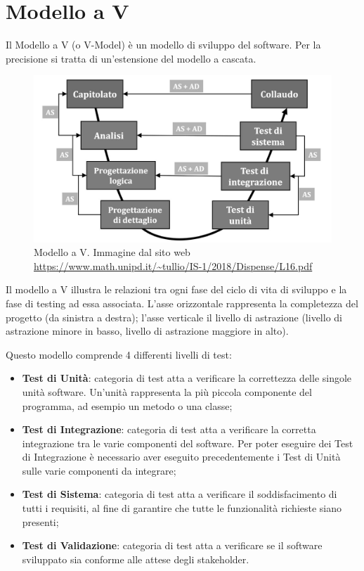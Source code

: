 \section{Modello a V}
\label{modelloV}

Il Modello a V (o V-Model) è un modello di sviluppo del software. Per la precisione si tratta di un'estensione del modello a cascata. 

\begin{figure}[H]
\centering
	\includegraphics[width=0.7\linewidth]{./images/modellov.jpg} 
	\caption{Modello a V. Immagine dal sito web \url{https://www.math.unipd.it/~tullio/IS-1/2018/Dispense/L16.pdf}}
	\label{vmodel}
\end{figure}

Il modello a V illustra le relazioni tra ogni fase del ciclo di vita di sviluppo e la fase di testing ad essa associata. L'asse orizzontale rappresenta la completezza del progetto (da sinistra a destra); l'asse verticale il livello di astrazione (livello di astrazione minore in basso, livello di astrazione maggiore in alto).

Questo modello comprende 4 differenti livelli di test: 
\begin{itemize}
	\item \textbf{Test di Unità}: categoria di test atta a verificare la correttezza delle singole unità software. Un'unità rappresenta la più piccola componente del programma, ad esempio un metodo o una classe;
	\item \textbf{Test di Integrazione}: categoria di test atta a verificare la corretta integrazione tra le varie componenti del software. Per poter eseguire dei Test di Integrazione è necessario aver eseguito precedentemente i Test di Unità sulle varie componenti da integrare;
	\item \textbf{Test di Sistema}: categoria di test atta a verificare il soddisfacimento di tutti i requisiti, al fine di garantire che tutte le funzionalità richieste siano presenti;
	\item \textbf{Test di Validazione}: categoria di test atta a verificare se il software sviluppato sia conforme alle attese degli stakeholder.
\end{itemize}

